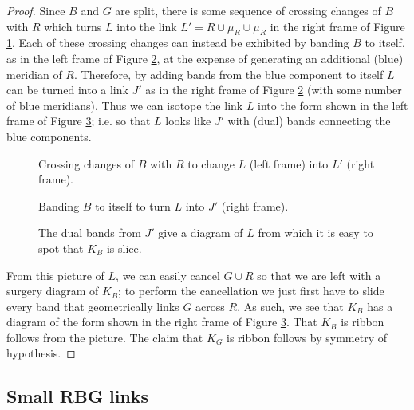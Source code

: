 \documentclass [11pt]{amsart}
\theoremstyle{remark}
\begin{document}
\begin{proof}
Since $B$ and $G$ are split, there is some sequence of crossing changes of $B$ with $R$ which turns $L$ into the link $L'=R\cup\mu_R\cup\mu_R$ in the right frame of Figure \ref{fig:slicelemma1}. Each of these crossing changes can instead be exhibited by banding $B$ to itself, as in the left frame of Figure \ref{fig:slicelemma2}, at the expense of generating an additional (blue) meridian of $R$. Therefore, by adding bands from the blue component to itself $L$ can be turned into a link $J'$ as in the right frame of Figure \ref{fig:slicelemma2} (with some number of blue meridians). Thus we can isotope the link $L$ into the form shown in the left frame of Figure \ref{fig:slicelemma3}; i.e. so that $L$ looks like $J'$ with (dual) bands connecting the blue components. 

\begin{figure}
{
   \fontsize{9pt}{11pt}\selectfont
   \def\svgwidth{5in}
   
}
\caption{Crossing changes of $B$ with $R$ to change $L$ (left frame) into $L'$ (right frame).} 
\label{fig:slicelemma1}
\end{figure}

\begin{figure}
{
   \fontsize{9pt}{11pt}\selectfont
   \def\svgwidth{5in}
   
}
\caption{Banding $B$ to itself to turn $L$ into $J'$ (right frame).}
\label{fig:slicelemma2}
\end{figure}

\begin{figure}
{
   \fontsize{9pt}{11pt}\selectfont
   \def\svgwidth{3in}
   
}
\caption{The dual bands from $J'$ give a diagram of $L$ from which it is easy to spot that $K_B$ is slice.}
\label{fig:slicelemma3}
\end{figure}


From this picture of $L$, we can easily cancel $G\cup R$ so that we are left with a surgery diagram of $K_B$; to perform the cancellation we just first  have to slide every band that geometrically links $G$ across $R$. As such, we see that $K_B$ has a diagram of the form shown in the right frame of Figure \ref{fig:slicelemma3}. That $K_B$ is ribbon follows from the picture. The claim that $K_G$ is ribbon  follows by symmetry of hypothesis. 
\end{proof}

\subsection{Small RBG links}
\end{document}
